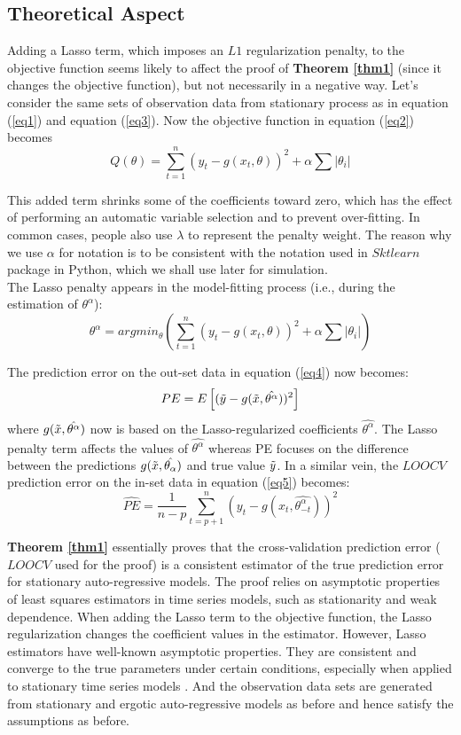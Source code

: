 \documentclass[12pt, oneside]{amsart}
\theoremstyle{definition}
\theoremstyle{remark}
\numberwithin{equation}{section}
\begin{document}
\subsection{Theoretical Aspect}
Adding a Lasso term, which imposes an $L1$ regularization penalty, to the objective function seems likely to affect the proof of \textbf{Theorem \ref{thm1}} (since it changes the objective function), but not necessarily in a negative way. Let's consider the same sets of observation data from stationary process as in equation (\ref{eq1}) and equation (\ref{eq3}). Now the objective function in equation (\ref{eq2}) becomes 
$$Q(\theta) = \sum^n_{t=1} (y_t - g(x_t, \theta))^2 + \alpha \sum |\theta_i|
$$ 

This added term shrinks some of the coefficients toward zero, which has the effect of performing an automatic variable selection and to prevent over-fitting. In common cases, people also use $\lambda$ to represent the penalty weight. The reason why we use $\alpha$ for notation is to be consistent with the notation used in $Sktlearn$ package in Python, which we shall use later for simulation.\\

The Lasso penalty appears in the model-fitting process (i.e., during the estimation of $\theta^\alpha$):
$$\theta^\alpha = arg min_\theta \left( \sum^n_{t=1} (y_t - g(x_t, \theta))^2 + \alpha \sum |\theta_i| \right)$$

The prediction error on the out-set data in equation (\ref{eq4}) now becomes: 
\begin{equation}\label{eq7}
    PE = E\left[(\Tilde{y} - g(\Tilde{x},\hat{\theta^\alpha}))^2\right]
\end{equation}
where $g(\Tilde{x},\hat{\theta^\alpha})$ now is based on the Lasso-regularized coefficients $\hat{\theta^\alpha}$. The Lasso penalty term affects the values of $\hat{\theta^\alpha}$ whereas PE focuses on the difference between the predictions $g(\Tilde{x},\hat{\theta_\alpha})$ and true value $\Tilde{y}$. In a similar vein, the $LOOCV$ prediction error on the in-set data in equation (\ref{eq5}) becomes: 
\begin{equation}\label{eq8}
\hat{PE} = \frac{1}{n-p} \sum_{t=p+1}^n \left( y_t - g(x_t,\hat{\theta^\alpha_{-t}}) \right)^2
\end{equation}

\textbf{Theorem \ref{thm1}} essentially proves that the cross-validation prediction error ($LOOCV$ used for the proof) is a consistent estimator of the true prediction error for stationary auto-regressive models. The proof relies on asymptotic properties of least squares estimators in time series models, such as stationarity and weak dependence. When adding the Lasso term to the objective function, the Lasso regularization changes the coefficient values in the estimator. However, Lasso estimators have well-known asymptotic properties. They are consistent and converge to the true parameters under certain conditions, especially when applied to stationary time series models \citep{Tibshirani}. And the observation data sets are generated from stationary and ergotic auto-regressive models as before and hence satisfy the assumptions as before.\\
\end{document}
